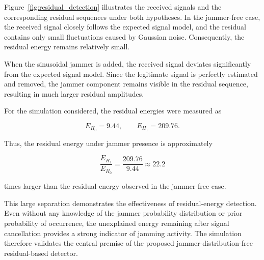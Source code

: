 \documentclass{article}
\begin{document}
Figure~\ref{fig:residual_detection} illustrates the received signals and the corresponding residual sequences under both hypotheses. In the jammer-free case, the received signal closely follows the expected signal model, and the residual contains only small fluctuations caused by Gaussian noise. Consequently, the residual energy remains relatively small.

When the sinusoidal jammer is added, the received signal deviates significantly from the expected signal model. Since the legitimate signal is perfectly estimated and removed, the jammer component remains visible in the residual sequence, resulting in much larger residual amplitudes.

For the simulation considered, the residual energies were measured as

\begin{equation}
E_{H_0}=9.44,
\qquad
E_{H_1}=209.76.
\end{equation}

Thus, the residual energy under jammer presence is approximately

\begin{equation}
\frac{E_{H_1}}{E_{H_0}}
=
\frac{209.76}{9.44}
\approx 22.2
\end{equation}

times larger than the residual energy observed in the jammer-free case.

This large separation demonstrates the effectiveness of residual-energy detection. Even without any knowledge of the jammer probability distribution or prior probability of occurrence, the unexplained energy remaining after signal cancellation provides a strong indicator of jamming activity. The simulation therefore validates the central premise of the proposed jammer-distribution-free residual-based detector.
\end{document}
